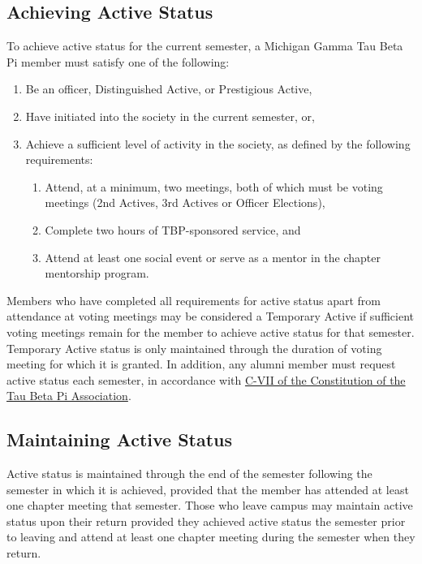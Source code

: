 \subsection{Achieving Active Status} \label{VIII.1}

To achieve active status for the current
semester, a Michigan Gamma Tau Beta Pi member must satisfy one of the following:
\begin{enumerate}
    \item Be an officer, Distinguished Active, or Prestigious Active,
    \item Have initiated into the society in the current semester, or,
    \item Achieve a sufficient level of activity in the society, as defined by the following requirements:
    \begin{enumerate}
        \item Attend, at a minimum, two meetings, both of which must be voting meetings
(2nd Actives, 3rd Actives or Officer Elections),
        \item Complete two hours of TBP-sponsored service, and
        \item Attend at least one social event or serve as a mentor in the chapter mentorship
program.
    \end{enumerate}
\end{enumerate}
Members who have completed all requirements for active status apart from attendance
at voting meetings may be considered a Temporary Active if sufficient voting meetings
remain for the member to achieve active status for that semester. Temporary Active status
is only maintained through the duration of voting meeting for which it is granted.
In addition, any alumni member must request active status each semester, in accordance
with \href{http://www.tbp.org/off/ConstBylaw.pdf}{C-VII of the Constitution of the Tau Beta Pi Association}.


\subsection{Maintaining Active Status} \label{VIII.2}

Active status is maintained through the
end of the semester following the semester in which it is achieved, provided that the member
has attended at least one chapter meeting that semester. Those who leave campus may
maintain active status upon their return provided they achieved active status the semester
prior to leaving and attend at least one chapter meeting during the semester when they
return.


